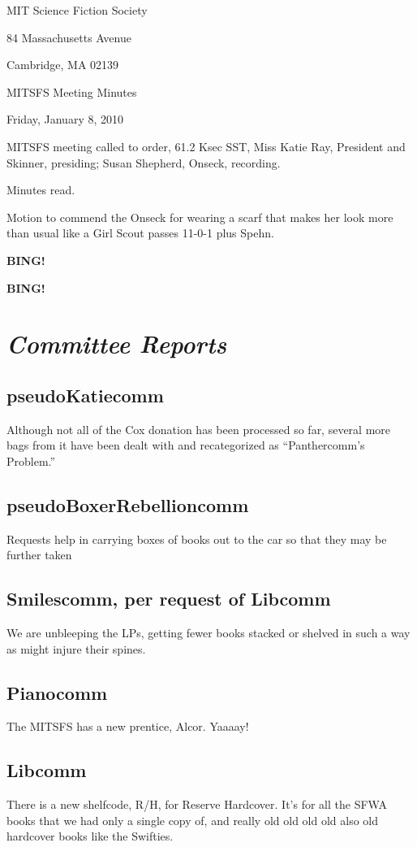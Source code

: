 \documentclass[10pt]{article}
\newcommand{\bing}{{\bf BING!} }
\newcommand{\goto}[1]{\bing \vskip 12pt \section*{{\em{#1}}}}
\newcommand{\ps}{ plus Spehn\xspace}
\newcommand{\skinner}{Miss Katie Ray, President and Skinner}
\newcommand{\onseck}{Susan Shepherd, Onseck}
\newcommand{\meetingdate}{Friday, January 8, 2010}
\begin{document}
\begin{center}

MIT Science Fiction Society

84 Massachusetts Avenue

Cambridge, MA 02139

\vspace{12pt}

MITSFS Meeting Minutes

\meetingdate

\end{center}

\vspace{18pt}

\setlength{\parskip}{6pt}

\noindent
MITSFS meeting called to order, 61.2 Ksec SST,
\skinner, presiding; \onseck, recording.

Minutes read.

Motion to commend the Onseck for wearing a scarf that makes her look more than usual like a Girl Scout passes 11-0-1\ps.

\bing

\goto{Committee Reports}

\subsection*{pseudoKatiecomm}
Although not all of the Cox donation has been processed so far, several more bags from it have been dealt with and recategorized as ``Panthercomm's Problem.''

\subsection*{pseudoBoxerRebellioncomm}
Requests help in carrying boxes of books out to the car so that they may be further taken

\subsection*{Smilescomm, per request of Libcomm}
We are unbleeping the LPs, getting fewer books stacked or shelved in such a way as might injure their spines.

\subsection*{Pianocomm}
The MITSFS has a new prentice, Alcor. Yaaaay!

\subsection*{Libcomm}
There is a new shelfcode, R/H, for Reserve Hardcover. It's for all the SFWA books that we had only a single copy of, and really old old old old also old hardcover books like the Swifties.
\end{document}
